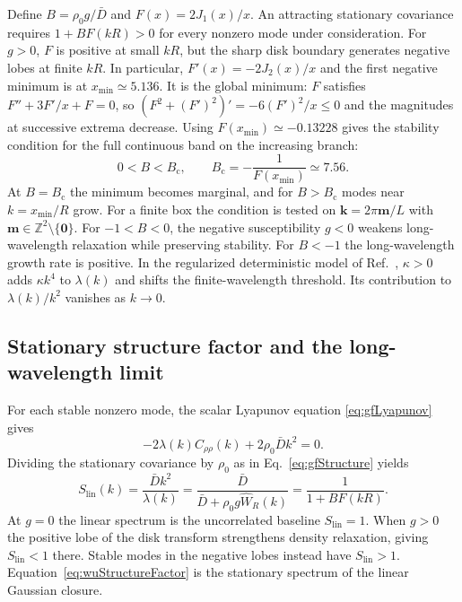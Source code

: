 \documentclass{article}
\begin{document}
Define $B=\rho_0g/\bar D$ and $F(x)=2J_1(x)/x$. An attracting stationary covariance requires $1+BF(kR)>0$ for every nonzero mode under consideration. For $g>0$, $F$ is positive at small $kR$, but the sharp disk boundary generates negative lobes at finite $kR$. In particular, $F'(x)=-2J_2(x)/x$ and the first negative minimum is at $x_{\min}\simeq5.136$. It is the global minimum: $F$ satisfies $F''+3F'/x+F=0$, so $(F^2+(F')^2)'=-6(F')^2/x\leq0$ and the magnitudes at successive extrema decrease. Using $F(x_{\min})\simeq-0.13228$ gives the stability condition for the full continuous band on the increasing branch:
\begin{equation}
    0<B<B_{\mathrm c},\qquad B_{\mathrm c}=-\frac{1}{F(x_{\min})}\simeq7.56.
    \label{eq:wuStability}
\end{equation}
At $B=B_{\mathrm c}$ the minimum becomes marginal, and for $B>B_{\mathrm c}$ modes near $k=x_{\min}/R$ grow. For a finite box the condition is tested on $\mathbf k=2\pi\mathbf m/L$ with $\mathbf m\in\mathbb Z^2\setminus\{\mathbf0\}$. For $-1<B<0$, the negative susceptibility $g<0$ weakens long-wavelength relaxation while preserving stability. For $B<-1$ the long-wavelength growth rate is positive. In the regularized deterministic model of Ref.~\cite{Wu2026NonlocalSensing}, $\kappa>0$ adds $\kappa k^4$ to $\lambda(k)$ and shifts the finite-wavelength threshold. Its contribution to $\lambda(k)/k^2$ vanishes as $k\to0$.

\subsection{Stationary structure factor and the long-wavelength limit}

For each stable nonzero mode, the scalar Lyapunov equation \eqref{eq:gfLyapunov} gives
\begin{equation}
    -2\lambda(k)C_{\rho\rho}(k)+2\rho_0\bar D k^2=0.
\end{equation}
Dividing the stationary covariance by $\rho_0$ as in Eq.~\eqref{eq:gfStructure} yields
\begin{equation}
    \boxed{S_{\mathrm{lin}}(k)=\frac{\bar D k^2}{\lambda(k)}
    =\frac{\bar D}{\bar D+\rho_0g\widehat W_R(k)}
    =\frac{1}{1+BF(kR)}.}
    \label{eq:wuStructureFactor}
\end{equation}
At $g=0$ the linear spectrum is the uncorrelated baseline $S_{\mathrm{lin}}=1$. When $g>0$ the positive lobe of the disk transform strengthens density relaxation, giving $S_{\mathrm{lin}}<1$ there. Stable modes in the negative lobes instead have $S_{\mathrm{lin}}>1$. Equation~\eqref{eq:wuStructureFactor} is the stationary spectrum of the linear Gaussian closure.
\end{document}
